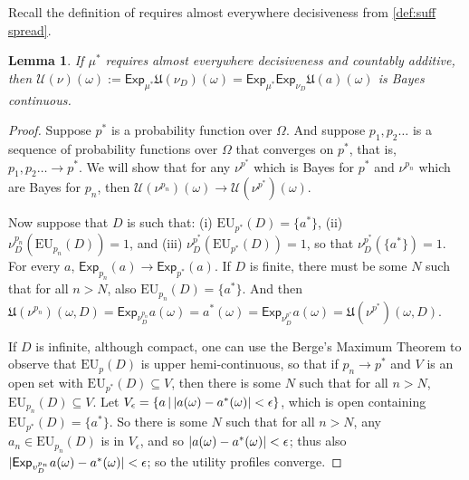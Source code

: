 \documentclass[a4paper]{article}
\newtheorem{lemma}[theorem]{Lemma}
\newcommand\Exp{\mathsf{Exp}}
\newcommand\EU{\mathrm{EU}}
\newcommand\U{\mathfrak{U}} %
\newcommand\Uwald{\mathcal{U}} %
\newcommand{\todoinfo}[2][]{\todo[backgroundcolor=orange!80,bordercolor=black,linecolor=gray!80, #1,inline,caption={}]{#2}}
\newcommand\SetDelimiter[1][]{
	\nonscript\,#1\vert \allowbreak \nonscript\,\mathopen{}}
\providecommand\given{\SetDelimiter}
\DeclarePairedDelimiter\abs{\lvert}{\rvert}%
\newenvironment{CCM rewritten}
{\begingroup\color{blue}} %
{\endgroup}              %
\begin{document}
Recall the definition of requires almost everywhere decisiveness from \cref{def:suff spread}.
\begin{lemma}\label{thm:cct-appln:cts}
	If ${\mu^*}$ requires almost everywhere decisiveness and countably additive, then $\Uwald(\nu)(\omega):=\Exp_{\mu^*}\U({\nu_{D}})(\omega)=\Exp_{\mu^*}\Exp_{\nu_D}\U(a)(\omega)$ is Bayes continuous. 
\end{lemma}
\begin{proof}
Suppose $p^*$ is a probability function over $\Omega$. And suppose $p_1,p_2\ldots$ is a sequence of probability functions over $\Omega$ that converges on $p^*$, that is, $p_1,p_2\ldots \longrightarrow p^*$. We will show that for any $\nu^{p^*}$ which is Bayes for $p^*$ and $\nu^{p_n}$ which are Bayes for $p_n$, then $\Uwald(\nu^{p_n})(\omega)\longrightarrow\Uwald(\nu^{p^*})(\omega)$. 

Now suppose that $D$ is such that: (i) $\EU_{p^*}(D)= \{a^*\}$, (ii) $\nu^{p_n}_D(\EU_{p_n}(D))=1$, and (iii) $\nu^{p^*}_D(\EU_{p^*}(D))=1$, so that $\nu^{p^*}_D(\{a^*\}) = 1$. 
For every $a$,  $\Exp_{p_n}(a)\longrightarrow\Exp_{p^*}(a)$. If $D$ is finite, there must be some $N$ such that for all $n>N$, also $\EU_{p_n}(D)=\{a^*\}$. And then $\U(\nu^{p_n})(\omega, D)=\Exp_{\nu^{p_n}_D}a(\omega)=a^*(\omega)= \Exp_{\nu^{p^*}_D}a(\omega) = \U(\nu^{p^*})(\omega, D)$.  

If $D$ is infinite, although compact, one can use the Berge's Maximum Theorem to observe that $\EU_p(D)$ is upper hemi-continuous, so that if $p_n\longrightarrow p^*$ and $V$ is an open set with $\EU_{p^*}(D)\subseteq V$, then there is some $N$ such that for all $n>N$, $\EU_{p_n}(D)\subseteq V$. Let $V_{\epsilon}=\{a\given \abs{a(\omega)-a^*(\omega)}<\epsilon\}$, which is open containing $\EU_{p^*}(D)=\{a^*\}$. So there is some $N$ such that for all $n>N$, any $a_n\in\EU_{p_n}(D)$ is in $V_{\epsilon}$, and so $\abs{a(\omega)-a^*(\omega)}<\epsilon$; thus also $\abs{\Exp_{v_D^{p_n}} a(\omega)- a^*(\omega)}<\epsilon$; so the utility profiles converge. 



\end{proof}
\end{document}
